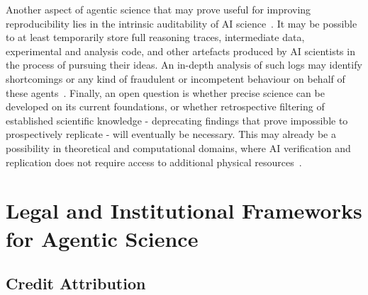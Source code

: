 \documentclass[11pt, a4paper, twocolumn, goog]{google}
\begin{document}
Another aspect of agentic science that may prove useful for improving reproducibility lies in the intrinsic auditability of AI science~\citep{pratt2026symposiumtrustauditablerecords}. It may be possible to at least temporarily store full reasoning traces, intermediate data, experimental and analysis code, and other artefacts produced by AI scientists in the process of pursuing their ideas. An in-depth analysis of such logs may identify shortcomings or any kind of fraudulent or incompetent behaviour on behalf of these agents~\citep{korbak2025chain}. Finally, an open question is whether precise science can be developed on its current foundations, or whether retrospective filtering of established scientific knowledge - deprecating findings that prove impossible to prospectively replicate - will eventually be necessary. This may already be a possibility in theoretical and computational domains, where AI verification and replication does not require access to additional physical resources~\citep{toledo2025ai, starace2025paperbench}.

\section{Legal and Institutional Frameworks for Agentic Science}
\label{sec:legal}

\subsection{Credit Attribution}
\label{sec:attribution}
\end{document}
